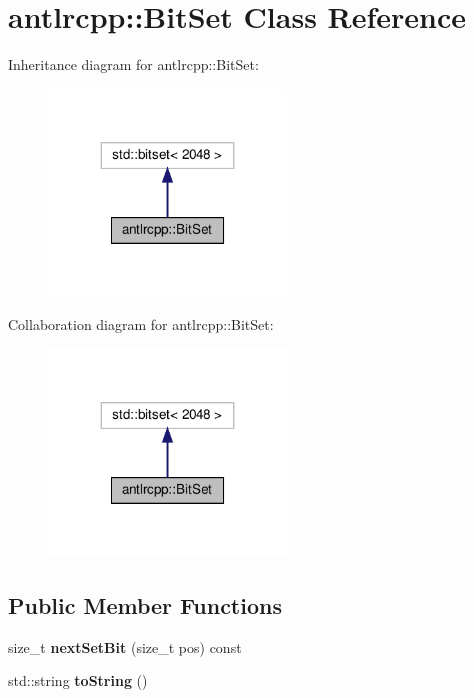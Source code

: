 \hypertarget{classantlrcpp_1_1BitSet}{}\section{antlrcpp\+:\+:Bit\+Set Class Reference}
\label{classantlrcpp_1_1BitSet}


Inheritance diagram for antlrcpp\+:\+:Bit\+Set\+:
\nopagebreak
\begin{figure}[H]
\begin{center}
\leavevmode
\includegraphics[width=179pt]{classantlrcpp_1_1BitSet__inherit__graph}
\end{center}
\end{figure}


Collaboration diagram for antlrcpp\+:\+:Bit\+Set\+:
\nopagebreak
\begin{figure}[H]
\begin{center}
\leavevmode
\includegraphics[width=179pt]{classantlrcpp_1_1BitSet__coll__graph}
\end{center}
\end{figure}
\subsection*{Public Member Functions}
\begin{DoxyCompactItemize}
\item 
\mbox{\label{classantlrcpp_1_1BitSet_a42f487492a858e90b594a24615241500}} 
size\+\_\+t {\bfseries next\+Set\+Bit} (size\+\_\+t pos) const
\item 
\mbox{\label{classantlrcpp_1_1BitSet_a58716f50db7fc6490a2611af9437b6f7}} 
std\+::string {\bfseries to\+String} ()
\end{DoxyCompactItemize}
